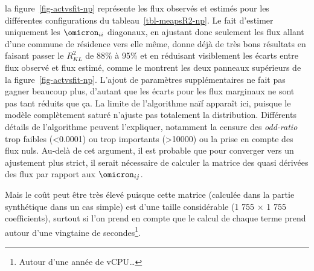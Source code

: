 \documentclass[
  10pt,
  a4paper,
  numbers=noendperiod,
  DIV=9]{scrartcl}
\begin{document}
la figure~\ref{fig-actvsfit-np} représente les flux observés et estimés
pour les différentes configurations du tableau~\ref{tbl-meapsR2-np}. Le
fait d'estimer uniquement les \(\omicron_{ii}\) diagonaux, en ajustant
donc seulement les flux allant d'une commune de résidence vers elle
même, donne déjà de très bons résultats en faisant passer le
\(R^2_{KL}\) de 88\% à 95\% et en réduisant visiblement les écarts entre
flux observé et flux estimé, comme le montrent les deux panneaux
supérieurs de la figure~\ref{fig-actvsfit-np}. L'ajout de paramètres
supplémentaires ne fait pas gagner beaucoup plus, d'autant que les
écarts pour les flux marginaux ne sont pas tant réduits que ça. La
limite de l'algorithme naïf apparaît ici, puisque le modèle complètement
saturé n'ajuste pas totalement la distribution. Différents détails de
l'algorithme peuvent l'expliquer, notamment la censure des
\emph{odd-ratio} trop faibles (\textless0.0001) ou trop importants
(\textgreater10000) ou la prise en compte des flux nuls. Au-delà de cet
argument, il est probable que pour converger vers un ajustement plus
strict, il serait nécessaire de calculer la matrice des quasi dérivées
des flux par rapport aux \(\omicron_{ij}\).

Mais le coût peut être très élevé puisque cette matrice (calculée dans
la partie synthétique dans un cas simple) est d'une taille considérable
(1 755 \(\times\) 1 755 coefficients), surtout si l'on prend en compte
que le calcul de chaque terme prend autour d'une vingtaine de
secondes\footnote{Autour d'une année de vCPU\ldots{}}.
\end{document}
